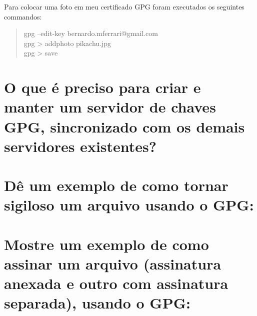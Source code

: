 \documentclass[12pt, letterpaper]{article}
\begin{document}
Para colocar uma foto em meu certificado GPG foram executados os seguintes commandos:
\begin{quote}
  gpg --edit-key bernardo.mferrari@gmail.com \\
  gpg \textgreater{} addphoto pikachu.jpg \\
  gpg \textgreater{} save\\
\end{quote}

\section{O que é preciso para criar e manter um servidor de chaves GPG, sincronizado com os demais servidores existentes?}

\section{Dê um exemplo de como tornar sigiloso um arquivo usando o GPG:}

\section{Mostre um exemplo de como assinar um arquivo (assinatura anexada e outro com assinatura separada), usando o GPG:}
\end{document}
